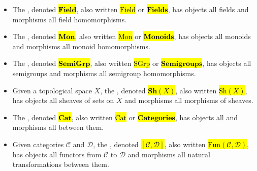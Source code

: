 \begin{definition}
\begin{itemize}
    \item The , denoted \hl{$\mathbf{Field}$}, also written \hl{$\mathrm{Field}$} or \hl{$\mathbf{Fields}$}, has objects all fields and morphisms all field homomorphisms.
    \item The , denoted \hl{$\mathbf{Mon}$}, also written \hl{$\mathrm{Mon}$} or \hl{$\mathbf{Monoids}$}, has objects all monoids and morphisms all monoid homomorphisms.
    \item The , denoted \hl{$\mathbf{SemiGrp}$}, also written \hl{$\mathrm{SGrp}$} or \hl{$\mathbf{Semigroups}$}, has objects all semigroups and morphisms all semigroup homomorphisms.
    \item Given a topological space $X$, the , denoted \hl{$\mathbf{Sh}(X)$}, also written \hl{$\mathrm{Sh}(X)$}, has objects all sheaves of sets on $X$ and morphisms all morphisms of sheaves.
    \item The , denoted \hl{$\mathbf{Cat}$}, also written \hl{$\mathrm{Cat}$} or \hl{$\mathbf{Categories}$}, has objects all  and morphisms all  between them.
    \item Given categories $\mathcal{C}$ and $\mathcal{D}$, the , denoted \hl{$[\mathcal{C},\mathcal{D}]$}, also written \hl{$\mathrm{Fun}(\mathcal{C},\mathcal{D})$}, has objects all functors from $\mathcal{C}$ to $\mathcal{D}$ and morphisms all natural transformations between them.
\end{itemize}
\end{definition}